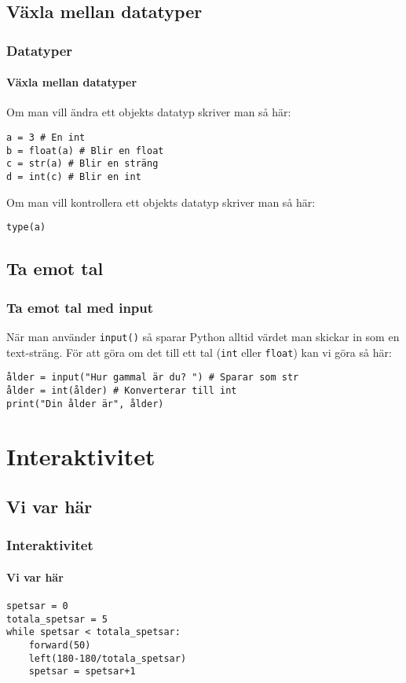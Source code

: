\documentclass[aspectratio=169]{beamer}
\begin{document}
\subsection{Växla mellan datatyper}

\begin{frame}[fragile]
	\frametitle{Datatyper}
	\framesubtitle{Växla mellan datatyper}
	
	Om man vill ändra ett objekts datatyp skriver man så här:
	
	\begin{lstlisting}
a = 3 # En int
b = float(a) # Blir en float
c = str(a) # Blir en sträng
d = int(c) # Blir en int
	\end{lstlisting}
	
	Om man vill kontrollera ett objekts datatyp skriver man så här:
	
	\begin{lstlisting}
type(a)
	\end{lstlisting}
	
\end{frame}

\subsection{Ta emot tal}

\begin{frame}[fragile]
	\frametitle{Ta emot tal med input}
	
	När man använder \texttt{input()} så sparar Python alltid värdet man skickar in som en text-sträng. För att göra om det till ett tal (\texttt{int} eller \texttt{float}) kan vi göra så här:
	
	\begin{lstlisting}
ålder = input("Hur gammal är du? ") # Sparar som str
ålder = int(ålder) # Konverterar till int
print("Din ålder är", ålder)
	\end{lstlisting}	

\end{frame}

\section{Interaktivitet}

\subsection{Vi var här}

\begin{frame}[fragile]
	\frametitle{Interaktivitet}
	\framesubtitle{Vi var här}
	
	\begin{lstlisting}
spetsar = 0
totala_spetsar = 5
while spetsar < totala_spetsar:
    forward(50)
    left(180-180/totala_spetsar)
    spetsar = spetsar+1
	\end{lstlisting}
	
\end{frame}
\end{document}
